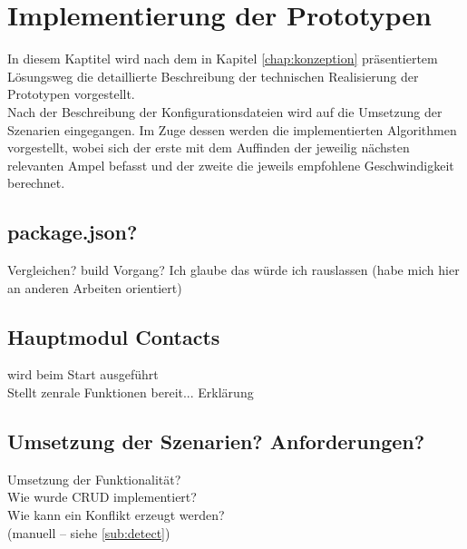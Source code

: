 \chapter{\label{chap:implementierung}Implementierung der Prototypen}
In diesem Kaptitel wird nach dem in Kapitel \ref{chap:konzeption} präsentiertem Lösungsweg die detaillierte Beschreibung der technischen Realisierung der Prototypen vorgestellt.\\
Nach der Beschreibung der Konfigurationsdateien wird auf die Umsetzung der Szenarien eingegangen. Im Zuge dessen werden die implementierten Algorithmen vorgestellt, wobei sich der erste mit dem Auffinden der jeweilig nächsten relevanten Ampel befasst und der zweite die jeweils empfohlene Geschwindigkeit berechnet.
\section{package.json?}
Vergleichen? build Vorgang? Ich glaube das würde ich rauslassen (habe mich hier an anderen Arbeiten orientiert)
\section{Hauptmodul Contacts}
wird beim Start ausgeführt\\
Stellt zenrale Funktionen bereit... Erklärung\\
\section{Umsetzung der Szenarien? Anforderungen?}
Umsetzung der Funktionalität? \\
Wie wurde CRUD implementiert?\\
Wie kann ein Konflikt erzeugt werden?\\
(manuell -- siehe \ref{sub:detect})
%
%
